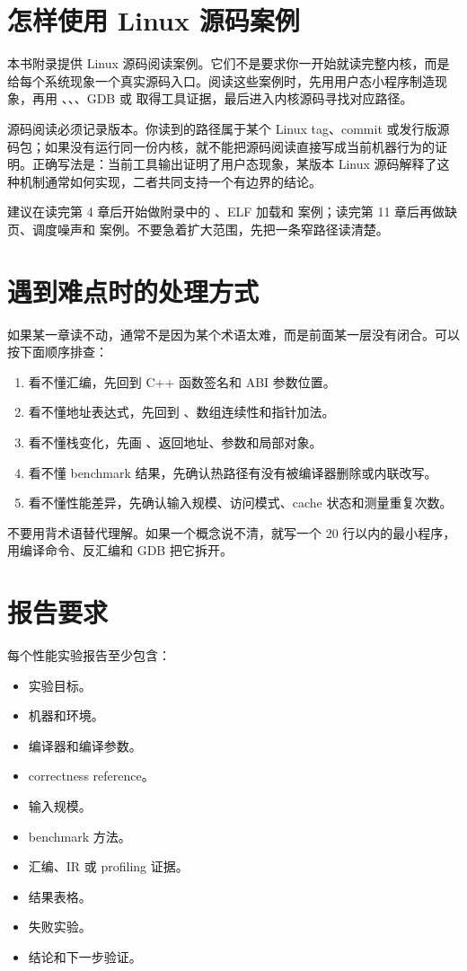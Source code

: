 \section*{怎样使用 Linux 源码案例}

本书附录提供 Linux 源码阅读案例。它们不是要求你一开始就读完整内核，而是给每个系统现象一个真实源码入口。阅读这些案例时，先用用户态小程序制造现象，再用 、、、GDB 或  取得工具证据，最后进入内核源码寻找对应路径。

源码阅读必须记录版本。你读到的路径属于某个 Linux tag、commit 或发行版源码包；如果没有运行同一份内核，就不能把源码阅读直接写成当前机器行为的证明。正确写法是：当前工具输出证明了用户态现象，某版本 Linux 源码解释了这种机制通常如何实现，二者共同支持一个有边界的结论。

建议在读完第 4 章后开始做附录中的 、ELF 加载和  案例；读完第 11 章后再做缺页、调度噪声和  案例。不要急着扩大范围，先把一条窄路径读清楚。

\section*{遇到难点时的处理方式}

如果某一章读不动，通常不是因为某个术语太难，而是前面某一层没有闭合。可以按下面顺序排查：

\begin{enumerate}
  \item 看不懂汇编，先回到 C++ 函数签名和 ABI 参数位置。
  \item 看不懂地址表达式，先回到 、数组连续性和指针加法。
  \item 看不懂栈变化，先画 、返回地址、参数和局部对象。
  \item 看不懂 benchmark 结果，先确认热路径有没有被编译器删除或内联改写。
  \item 看不懂性能差异，先确认输入规模、访问模式、cache 状态和测量重复次数。
\end{enumerate}

不要用背术语替代理解。如果一个概念说不清，就写一个 20 行以内的最小程序，用编译命令、反汇编和 GDB 把它拆开。

\section*{报告要求}

每个性能实验报告至少包含：

\begin{itemize}
  \item 实验目标。
  \item 机器和环境。
  \item 编译器和编译参数。
  \item correctness reference。
  \item 输入规模。
  \item benchmark 方法。
  \item 汇编、IR 或 profiling 证据。
  \item 结果表格。
  \item 失败实验。
  \item 结论和下一步验证。
\end{itemize}

